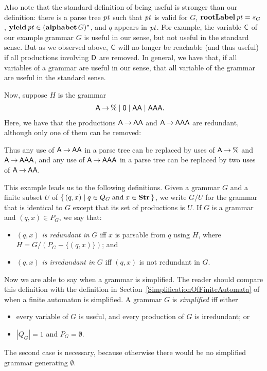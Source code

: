 Also note that the standard definition of being useful is stronger
than our definition: there is a parse tree ${\it pt}$ such that ${\it pt}$ is
valid for $G$, $\mathbf{rootLabel}\,{\it pt}=s_G$, $\mathbf{yield}\,{\it pt}\in
(\mathbf{alphabet}\,G)^*$, and $q$ appears in ${\it pt}$.  For example, the
variable $\mathsf{C}$ of our example grammar $G$ is useful in our sense, but
not useful in the standard sense.  But as we observed above, $\mathsf{C}$
will no longer be reachable (and thus useful) if all productions
involving $\mathsf{D}$ are removed.  In general, we have that, if all
variables of a grammar are useful in our sense, that all variable of
the grammar are useful in the standard sense.

Now, suppose $H$ is the grammar
\begin{align*}
\mathsf{A} &\mathbin{\to} \% \mid \mathsf{0} \mid \mathsf{AA} \mid \mathsf{AAA} .
\end{align*}
Here, we have that the productions $\mathsf{A}\mathbin{\to}\mathsf{AA}$ and
$\mathsf{A}\mathbin{\to}\mathsf{AAA}$ are redundant, although only one of them can be
removed:
\begin{center}
  
\end{center}
Thus any use of $\mathsf{A}\mathbin{\to}\mathsf{AA}$ in a parse tree can be replaced
by uses of $\mathsf{A}\mathbin{\to}\%$ and $\mathsf{A}\mathbin{\to}\mathsf{AAA}$, and any use of
$\mathsf{A}\mathbin{\to}\mathsf{AAA}$ in a parse tree can be replaced by two uses
of $\mathsf{A}\mathbin{\to}\mathsf{AA}$.

This example leads us to the following definitions.  Given a grammar
$G$ and a finite subset $U$ of $\{ \, (q,x) \mid q\in Q_G\;\allowbreak\mbox{and}\allowbreak\;
  x\in\mathbf{Str} \, \}$, we write $G/U$ for the grammar that is identical to $G$
except that its set of productions is $U$.
If $G$ is a grammar and $(q,x)\in P_G$, we say that:
\begin{itemize}
\item $(q,x)$ \emph{is redundant in} $G$ iff $x$ is parsable from $q$
 using $H$, where $H=G/(P_G - \{(q,x)\})$; and

\item $(q,x)$ \emph{is irredundant in} $G$ iff $(q,x)$ is not
  redundant in $G$.
\end{itemize}

Now we are able to say when a grammar is simplified.  The reader
should compare this definition with the definition in
Section~\ref{SimplificationOfFiniteAutomata} of when a finite
automaton is simplified.
A grammar $G$ is \emph{simplified} iff either
\begin{itemize}
\item every variable of $G$ is useful, and every production of $G$
  is irredundant; or

\item $|Q_G|=1$ and $P_G = \emptyset$.
\end{itemize}
The second case is necessary, because otherwise there would be
no simplified grammar generating $\emptyset$.

